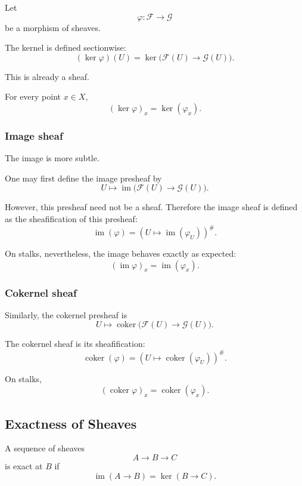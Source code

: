Let
\[
\varphi:\mathcal{F}\to \mathcal{G}
\]
be a morphism of sheaves.

The kernel is defined sectionwise:
\[
(\ker\varphi)(U)=\ker\bigl(\mathcal{F}(U)\to \mathcal{G}(U)\bigr).
\]

This is already a sheaf.

\begin{proposition}
	For every point \(x\in X\),
	\[
	(\ker\varphi)_x=\ker(\varphi_x).
	\]
\end{proposition}

\subsubsection{Image sheaf}

The image is more subtle.

One may first define the image presheaf by
\[
U\longmapsto \operatorname{im}\bigl(\mathcal{F}(U)\to \mathcal{G}(U)\bigr).
\]

However, this presheaf need not be a sheaf. Therefore the image sheaf is defined as the sheafification of this presheaf:
\[
\operatorname{im}(\varphi)=
\left(
U\longmapsto \operatorname{im}(\varphi_U)
\right)^{\#}.
\]

On stalks, nevertheless, the image behaves exactly as expected:
\[
(\operatorname{im}\varphi)_x=\operatorname{im}(\varphi_x).
\]

\subsubsection{Cokernel sheaf}

Similarly, the cokernel presheaf is
\[
U\longmapsto \operatorname{coker}\bigl(\mathcal{F}(U)\to \mathcal{G}(U)\bigr).
\]

The cokernel sheaf is its sheafification:
\[
\operatorname{coker}(\varphi)=
\left(
U\longmapsto \operatorname{coker}(\varphi_U)
\right)^{\#}.
\]

On stalks,
\[
(\operatorname{coker}\varphi)_x=\operatorname{coker}(\varphi_x).
\]

\subsection{Exactness of Sheaves}

\begin{definition}
	A sequence of sheaves
	\[
	A\longrightarrow B\longrightarrow C
	\]
	is exact at \(B\) if
	\[
	\operatorname{im}(A\to B)=\ker(B\to C).
	\]
\end{definition}

